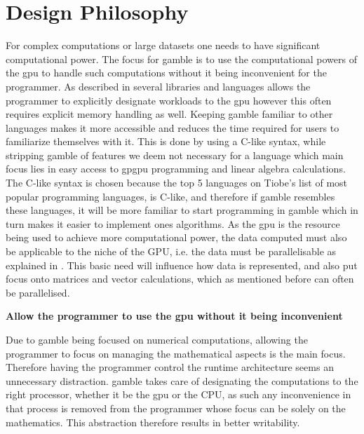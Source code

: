 \section{Design Philosophy}\label{sec:phil}

For complex computations or large datasets one needs to have significant computational power.
The focus for \gls{gamble} is to use the computational powers of the \acrshort{gpu} to handle such computations without it being inconvenient for the programmer.
As described in  several libraries and languages allows the programmer to explicitly designate workloads to the \acrshort{gpu} however this often requires explicit memory handling as well.
Keeping \gls{gamble} familiar to other languages makes it more accessible and reduces the time required for users to familiarize themselves with it.
This is done by using a C-like syntax, while stripping \gls{gamble} of features we deem not necessary for a language which main focus lies in easy access to \acrshort{gpgpu} programming and linear algebra calculations.
The C-like syntax is chosen because the top 5 languages on Tiobe's list of most popular programming languages, is C-like, and therefore if \gls{gamble} resembles these languages, it will be more familiar to start programming in \gls{gamble} which in turn makes it easier to implement ones algorithms.\citep{TIOBE}
As the \acrshort{gpu} is the resource being used to achieve more computational power, the data computed must also be applicable to the niche of the GPU, i.e. the data must be parallelisable as explained in .
This basic need will influence how data is represented, and also put focus onto matrices and vector calculations, which as mentioned before can often be parallelised.

\textbf{Allow the programmer to use the \acrshort{gpu} without it being inconvenient}

Due to \gls{gamble} being focused on numerical computations, allowing the programmer to focus on managing the mathematical aspects is the main focus.
Therefore having the programmer control the runtime architecture seems an unnecessary distraction.
\gls{gamble} takes care of designating the computations to the right processor, whether it be the \acrshort{gpu} or the CPU, as such any inconvenience in that process is removed from the programmer whose focus can be solely on the mathematics.
This abstraction therefore results in better writability.

